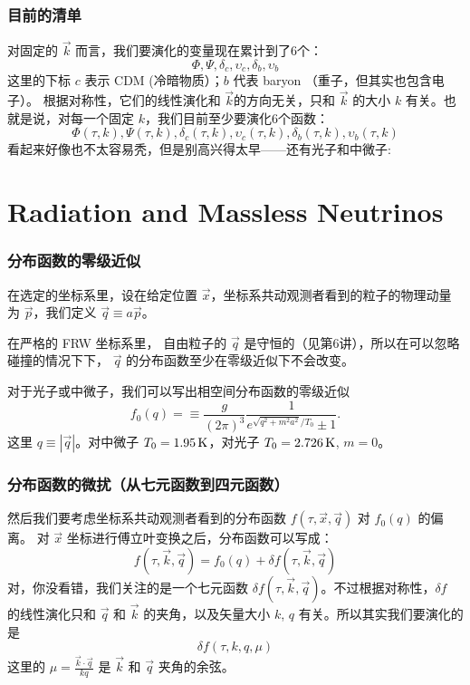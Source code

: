 \documentclass[CJK,13pt]{beamer}
\begin{document}
  \begin{frame}
    \frametitle{目前的清单}
    对固定的 $\vec{k}$ 而言，我们要演化的变量现在累计到了6个：
    $$\Phi, \Psi, \delta_c, \upsilon_c, \delta_b, \upsilon_b$$
    这里的下标 $c$ 表示 CDM (冷暗物质）；$b$ 代表 baryon （重子，但其实也包含电子）。
    根据对称性，它们的线性演化和 $\vec{k}$的方向无关，只和 $\vec{k}$ 的大小 $k$ 有关。也就是说，对每一个固定 $k$，我们目前至少要演化6个函数：
    {\blue $$\Phi(\tau, k), \Psi(\tau, k), \delta_c(\tau, k), \upsilon_c(\tau, k), \delta_b(\tau, k), \upsilon_b(\tau, k)$$}
    看起来好像也不太容易秃，但是别高兴得太早——还有光子和中微子:
  \end{frame}
  
\section{Radiation and Massless Neutrinos}


  \begin{frame}
    \frametitle{分布函数的零级近似}
    在选定的坐标系里，设在给定位置 $\vec{x}$，坐标系共动观测者看到的粒子的物理动量为 $\vec{p}$，我们定义 $\vec{q} \equiv a\vec{p}$。

    在严格的 FRW 坐标系里， 自由粒子的 $\vec{q}$ 是守恒的（见第6讲），所以在可以忽略碰撞的情况下下， $\vec{q}$ 的分布函数至少在零级近似下不会改变。

    \skipline

    对于光子或中微子，我们可以写出相空间分布函数的零级近似
    $$ f_0 (q) = \equiv \frac{g}{(2\pi)^3}\frac{1}{e^{\sqrt{q^2+m^2a^2}/T_0} \pm 1} . $$
    这里 $q \equiv |\vec{q}|$。对中微子 $T_0 = 1.95\,\mathrm{K}$，对光子  $T_0 = 2.726\,\mathrm{K}$, $m=0$。

  \end{frame}


  \begin{frame}
    \frametitle{分布函数的微扰（从七元函数到四元函数）}
    然后我们要考虑坐标系共动观测者看到的分布函数 $f(\tau, \vec{x}, \vec{q})$ 对 $f_0(q)$ 的偏离。 对 $\vec{x}$ 坐标进行傅立叶变换之后，分布函数可以写成：
    $$ f(\tau,\vec{k}, \vec{q}) = f_0(q) + \delta f (\tau, \vec{k},\vec{q}) $$
    对，你没看错，我们关注的是一个七元函数 $\delta f (\tau, \vec{k}, \vec{q})$。不过根据对称性，$\delta f$ 的线性演化只和 $\vec{q}$ 和 $\vec{k}$ 的夹角，以及矢量大小 $k$, $q$ 有关。所以其实我们要演化的是
    $$ \delta f(\tau, k, q, \mu) $$
    这里的 $\mu = \frac{\vec{k}\cdot\vec{q}}{kq}$ 是 $\vec{k}$ 和 $\vec{q}$ 夹角的余弦。

  \end{frame}
\end{document}
